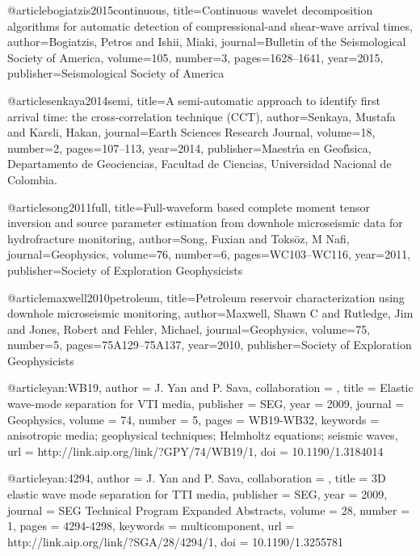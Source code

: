 @article{bogiatzis2015continuous,
  title={Continuous wavelet decomposition algorithms for automatic detection of compressional-and shear-wave arrival times},
  author={Bogiatzis, Petros and Ishii, Miaki},
  journal={Bulletin of the Seismological Society of America},
  volume={105},
  number={3},
  pages={1628--1641},
  year={2015},
  publisher={Seismological Society of America}
}

@article{senkaya2014semi,
  title={A semi-automatic approach to identify first arrival time: the cross-correlation technique (CCT)},
  author={Senkaya, Mustafa and Karsli, Hakan},
  journal={Earth Sciences Research Journal},
  volume={18},
  number={2},
  pages={107--113},
  year={2014},
  publisher={Maestr{\'\i}a en Geof{\'\i}sica, Departamento de Geociencias, Facultad de Ciencias, Universidad Nacional de Colombia.}
}

@article{song2011full,
  title={Full-waveform based complete moment tensor inversion and source parameter estimation from downhole microseismic data for hydrofracture monitoring},
  author={Song, Fuxian and Toks{\"o}z, M Nafi},
  journal={Geophysics},
  volume={76},
  number={6},
  pages={WC103--WC116},
  year={2011},
  publisher={Society of Exploration Geophysicists}
}

@article{maxwell2010petroleum,
  title={Petroleum reservoir characterization using downhole microseismic monitoring},
  author={Maxwell, Shawn C and Rutledge, Jim and Jones, Robert and Fehler, Michael},
  journal={Geophysics},
  volume={75},
  number={5},
  pages={75A129--75A137},
  year={2010},
  publisher={Society of Exploration Geophysicists}
}








@article{yan:WB19,
author = {J. Yan and P. Sava},
collaboration = {},
title = {Elastic wave-mode separation for {VTI} media},
publisher = {SEG},
year = {2009},
journal = {Geophysics},
volume = {74},
number = {5},
pages = {WB19-WB32},
keywords = {anisotropic media; geophysical techniques; Helmholtz equations; seismic waves},
url = {http://link.aip.org/link/?GPY/74/WB19/1},
doi = {10.1190/1.3184014}
}




@article{yan:4294,
author = {J. Yan and P. Sava},
collaboration = {},
title = {3{D} elastic wave mode separation for {TTI} media},
publisher = {SEG},
year = {2009},
journal = {SEG Technical Program Expanded Abstracts},
volume = {28},
number = {1},
pages = {4294-4298},
keywords = {multicomponent},
url = {http://link.aip.org/link/?SGA/28/4294/1},
doi = {10.1190/1.3255781}
}







